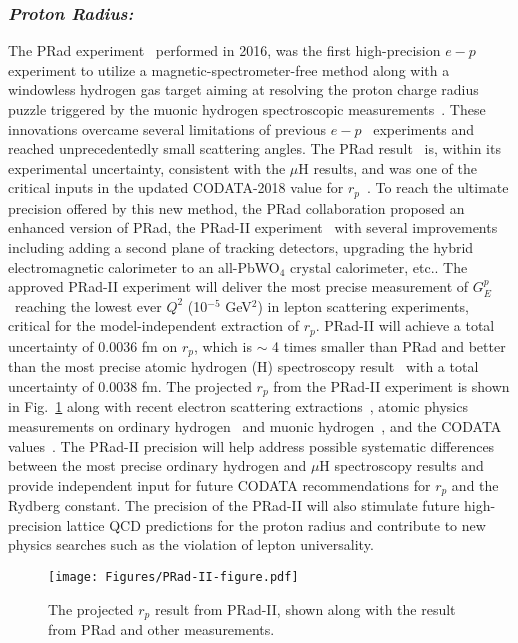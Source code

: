 \subsubsection*{\it Proton Radius:}
\label{sec:PRad}
The PRad experiment~\cite{PRad_nature:2019} performed in 2016, was the first high-precision $e-p$ experiment 
to utilize a magnetic-spectrometer-free method along with a windowless hydrogen gas target aiming at resolving the proton charge radius puzzle triggered by the muonic hydrogen spectroscopic measurements~\cite{Pohl10,Anti13}. These innovations overcame several limitations of previous $e-p$ ~experiments and reached unprecedentedly small scattering angles. The PRad result~\cite{PRad_nature:2019} is, within its experimental uncertainty, consistent with the $\mu$H results, and was one of the critical inputs in the updated CODATA-2018 value for $r_p$~\cite{CODATA_2018}. To reach the ultimate precision offered by this new method, the PRad collaboration proposed an enhanced version of PRad, the PRad-II experiment~\cite{PRad2} with several improvements including adding a second plane of tracking detectors, upgrading the hybrid electromagnetic calorimeter to an all-PbWO$_4$ crystal calorimeter, etc.. 
The approved PRad-II experiment will deliver the most precise measurement of $G^{p}_{E}$ ~reaching the lowest ever $Q^2$ (10$^{-5}$ GeV$^2$) in lepton scattering experiments, critical for the model-independent extraction of $r_p$. PRad-II will achieve a total uncertainty of 0.0036 fm on $r_p$,  which  is $\sim$ 4 times smaller than PRad and better than the most precise atomic hydrogen (H) spectroscopy result~\cite{Grinin20} with a total uncertainty of 0.0038 fm.
The projected $r_p$ from the PRad-II experiment is shown in Fig.~\ref{fig:PRad2_proj} along with recent electron scattering extractions~\cite{PRad_nature:2019,Bernauer10,Zhan11}, atomic physics measurements on ordinary hydrogen~\cite{CREMA_2017,hspec2018,Eric2019,Grinin20} and muonic hydrogen~\cite{Pohl10,Anti13}, and the CODATA values~\cite{CODATA_2014,CODATA_2018}.
The PRad-II precision will help address possible systematic differences between the most precise ordinary hydrogen and $\mu$H spectroscopy results and provide independent input for future CODATA recommendations for $r_p$ and the Rydberg constant. The precision of the PRad-II will also stimulate future high-precision lattice QCD predictions for the proton radius and contribute to new physics searches such as the violation of lepton universality.

\begin{figure}[ht]
\centerline{
\texttt{[image: Figures/PRad-II-figure.pdf]}}
\caption{The projected $r_{p}$ result from PRad-II, shown along with the result from PRad and other measurements.}
\label{fig:PRad2_proj}
\end{figure}

